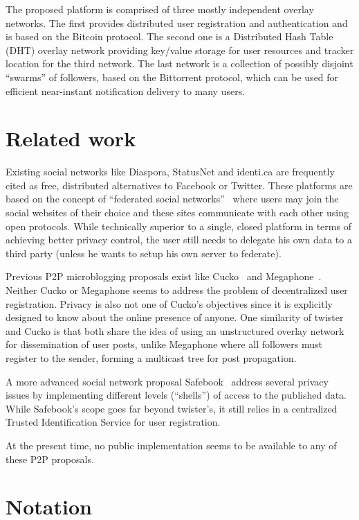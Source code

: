 \documentclass[a4paper,10pt]{article}
\begin{document}
The proposed platform is comprised of three mostly independent overlay networks. The first provides distributed user registration and authentication and is based on the Bitcoin protocol. The second one is a Distributed Hash Table (DHT) overlay network providing key/value storage for user resources and tracker location for the third network. The last network is a collection of possibly disjoint ``swarms'' of followers, based on the Bittorrent protocol, which can be used for efficient near-instant notification delivery to many users.

\section{Related work}

Existing social networks like Diaspora, StatusNet and identi.ca are frequently cited as free, distributed alternatives to Facebook or Twitter. These platforms are based on the concept of ``federated social networks''~\cite{wikipedia_distributed} where users may join the social websites of their choice and these sites communicate with each other using open protocols. While technically superior to a single, closed platform in terms of achieving better privacy control, the user still needs to delegate his own data to a third party (unless he wants to setup his own server to federate).

Previous P2P microblogging proposals exist like Cucko~\cite{xu2010cuckoo} and Megaphone~\cite{perfitt2010megaphone}. Neither Cucko or Megaphone seems to address the problem of decentralized user registration. Privacy is also not one of Cucko's objectives since it is explicitly designed to know about the online presence of anyone. One similarity of twister and Cucko is that both share the idea of using an unstructured overlay network for dissemination of user posts, unlike Megaphone where all followers must register to the sender, forming a multicast tree for post propagation.

A more advanced social network proposal Safebook~\cite{cutillo2009safebook} address several privacy issues by implementing different levels (``shells'') of access to the published data. While Safebook's scope goes far beyond twister's, it still relies in a centralized Trusted Identification Service for user registration.

At the present time, no public implementation seems to be available to any of these P2P proposals.

\section{Notation}
\end{document}
